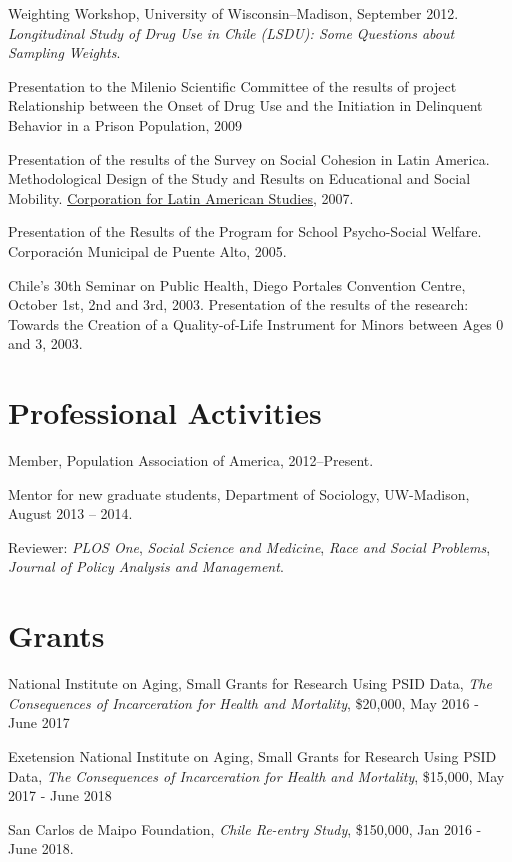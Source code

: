 \documentclass[10pt,letterpaper]{article}
\renewenvironment{itemize}{
  \begin{list}{}{
    \setlength{\leftmargin}{1.5em}
    \setlength{\itemsep}{0.25em}
    \setlength{\parskip}{0pt}
    \setlength{\parsep}{0.25em}
  }
}{
  \end{list}
}
\begin{document}
\begin{itemize}
\item Weighting Workshop, University of Wisconsin–Madison, September 2012. \textit{Longitudinal Study of Drug Use in Chile (LSDU): Some Questions about Sampling Weights}.

\item	Presentation to the Milenio Scientific Committee of the results of project Relationship between the Onset of Drug Use and the Initiation in Delinquent Behavior in a Prison Population, 2009

\item Presentation of the results of the Survey on Social Cohesion in Latin America. Methodological Design of the Study and Results on Educational and Social Mobility. \href{http://www.cieplan.org/}{Corporation for Latin American Studies}, 2007.

\item Presentation of the Results of the Program for School Psycho-Social Welfare. Corporación Municipal de Puente Alto, 2005.

\item Chile’s 30th Seminar on Public Health, Diego Portales Convention Centre, October 1st, 2nd and 3rd, 2003. Presentation of the results of the research: Towards the Creation of a Quality-of-Life Instrument for Minors between Ages 0 and 3, 2003.

\end{itemize}

\section*{Professional Activities}

\begin{itemize}
\item Member, Population Association of America, 2012--Present.
\item Mentor for new graduate students, Department of Sociology, UW-Madison,
August 2013 – 2014.
\item Reviewer: \textit{PLOS One}, \textit{Social Science and Medicine}, \textit{Race and Social Problems}, \textit{Journal of Policy Analysis and Management}.
\end{itemize}

\section*{Grants}

\begin{itemize}
\item National Institute on Aging, Small Grants for Research Using PSID Data, \textit{The Consequences of Incarceration for Health and Mortality},  \$20,000, May 2016 - June 2017
\item Exetension National Institute on Aging, Small Grants for Research Using PSID Data, \textit{The Consequences of Incarceration for Health and Mortality},  \$15,000, May 2017 - June 2018
\item San Carlos de Maipo Foundation, \textit{Chile Re-entry Study}, \$150,000, Jan 2016 - June 2018.
\end{itemize}
\end{document}
